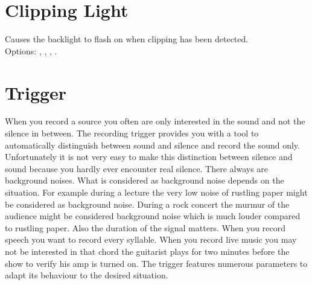 \section{Clipping Light}
    Causes the backlight to flash on when clipping has been detected.\\
    Options: , ,
    , .

\section{Trigger}
  When you record a source you often are only interested in the sound and not
  the silence in between. The recording trigger provides you with a
  tool to automatically distinguish between sound and silence and record the
  sound only.  Unfortunately it is not very easy to make this distinction between
  silence and sound because you hardly ever encounter real silence. There always
  are background noises. What is considered as background noise depends on the
  situation. For example during a lecture the very low noise of rustling paper
  might be considered as background noise. During a rock concert the murmur of
  the audience might be considered background noise which is much louder compared
  to rustling paper. Also the duration of the signal matters. When you record
  speech you want to record every syllable. When you record live music you may
  not be interested in that chord the guitarist plays for two minutes before
  the show to verify his amp is turned on. The trigger features numerous
  parameters to adapt its behaviour to the desired situation.
